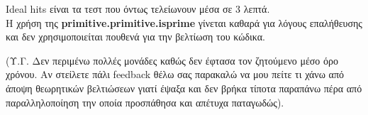 \documentclass{article}
\newcommand{\lt}[1]{\latintext #1\greektext}
\newcommand{\blt}[1]{\lt{\textbf{#1}}}
\begin{document}
{    \lt{Ideal hits} είναι τα τεστ που όντως τελείωνουν μέσα σε 3 λεπτά.\\
    
    H χρήση της \blt{primitive.primitive.isprime} γίνεται καθαρά για λόγους επαλήθευσης και δεν χρησιμοποιείται πουθενά για την βελτίωση του κώδικα.

    \newpage
    
    (Υ.Γ. Δεν περιμένω πολλές μονάδες καθώς δεν έφτασα τον ζητούμενο μέσο όρο χρόνου. Αν στείλετε πάλι \lt{feedback} θέλω σας παρακαλώ να μου πείτε τι χάνω από άποψη θεωρητικών βελτιώσεων γιατί έψαξα και δεν βρήκα τίποτα παραπάνω πέρα από παραλληλοποίηση την οποία προσπάθησα και απέτυχα παταγωδώς). %
}
\end{document}
